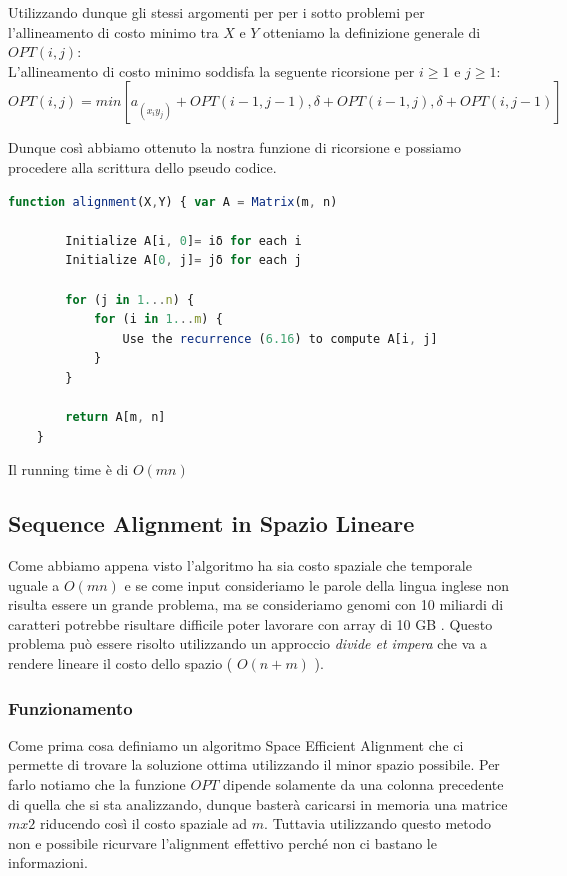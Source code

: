 Utilizzando dunque gli stessi argomenti per per i sotto problemi per
l'allineamento di costo minimo tra $X$ e $Y$ otteniamo la definizione generale
di $OPT(i,j)$:\\

L'allineamento di costo minimo soddisfa la seguente ricorsione per $i \geq 1$
e $j \geq 1$:
\[
    OPT(i,j) = min[a_{(x_i y_j)} + OPT(i-1, j-1),
            \delta + OPT(i-1, j), \delta + OPT(i, j-1)]
\]

Dunque così abbiamo ottenuto la nostra funzione di ricorsione e possiamo
procedere alla scrittura dello pseudo codice.

\begin{lstlisting}[language=JavaScript]
    function alignment(X,Y) { var A = Matrix(m, n)

        Initialize A[i, 0]= iδ for each i 
        Initialize A[0, j]= jδ for each j

        for (j in 1...n) { 
            for (i in 1...m) { 
                Use the recurrence (6.16) to compute A[i, j] 
            }
        }

        return A[m, n]
    }
\end{lstlisting}

Il running time è di $O(mn)$

\subsection{Sequence Alignment in Spazio Lineare}

Come abbiamo appena visto l'algoritmo ha sia costo spaziale che temporale uguale
a $O(mn)$ e se come input consideriamo le parole della lingua inglese non
risulta essere un grande problema, ma se consideriamo genomi con 10 miliardi di
caratteri potrebbe risultare difficile poter lavorare con array di 10 GB .
Questo problema può essere risolto utilizzando un approccio \textit{divide et impera}
che va a rendere lineare il costo dello spazio ( $O(n + m)$ ).

\subsubsection{Funzionamento}

Come prima cosa definiamo un algoritmo Space Efficient Alignment che ci permette
di trovare la soluzione ottima utilizzando il minor spazio possibile. Per farlo
notiamo che la funzione $OPT$ dipende solamente da una colonna precedente di
quella che si sta analizzando, dunque basterà caricarsi in memoria una matrice
$mx2$ riducendo così il costo spaziale ad $m$. Tuttavia utilizzando questo
metodo non e possibile ricurvare l'alignment effettivo perché non ci bastano le
informazioni.\\

